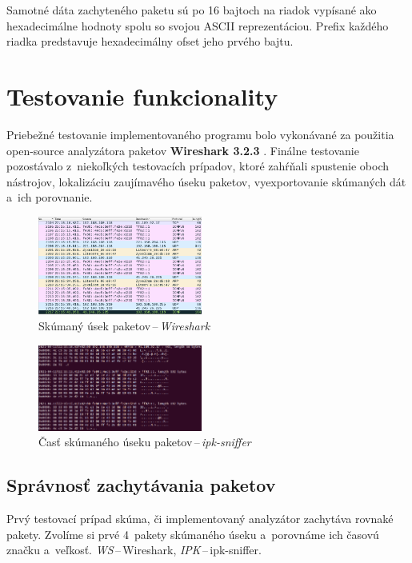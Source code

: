 \documentclass[a4paper, 11pt, twocolumn]{article}
\begin{document}
    Samotné dáta zachyteného paketu sú po 16 bajtoch na riadok vypísané ako hexadecimálne hodnoty spolu so svojou ASCII reprezentáciou. Prefix každého riadka predstavuje hexadecimálny ofset jeho prvého bajtu.

\section{Testovanie funkcionality}
    Priebežné testovanie implementovaného programu bolo vykonávané za použitia open-source analyzátora paketov \textbf{Wireshark 3.2.3} \cite{ws}. Finálne testovanie pozostávalo z~niekoľkých testovacích prípadov, ktoré zahŕňali spustenie oboch nástrojov, lokalizáciu zaujímavého úseku paketov, vyexportovanie skúmaných dát a~ich porovnanie.
    \pagebreak
    \begin{figure}[h]
        \centering
        \includegraphics[width=0.48\textwidth]{img/ws1.png}
        \caption{Skúmaný úsek paketov\,--\,\textit{Wireshark}}
    \end{figure}    
    \begin{figure}[h]
        \centering
        \includegraphics[width=0.48\textwidth]{img/my1.png}
        \caption{Časť skúmaného úseku paketov\,--\,\textit{ipk-sniffer}}
    \end{figure} 
    
    \subsection{Správnosť zachytávania paketov}
        Prvý testovací prípad skúma, či implementovaný analyzátor zachytáva rovnaké pakety. Zvolíme si prvé 4~pakety skúmaného úseku a~porovnáme ich časovú značku a~veľkosť. \textit{WS}\,--\,Wireshark, \textit{IPK}\,--\,ipk-sniffer.
        
\end{document}

